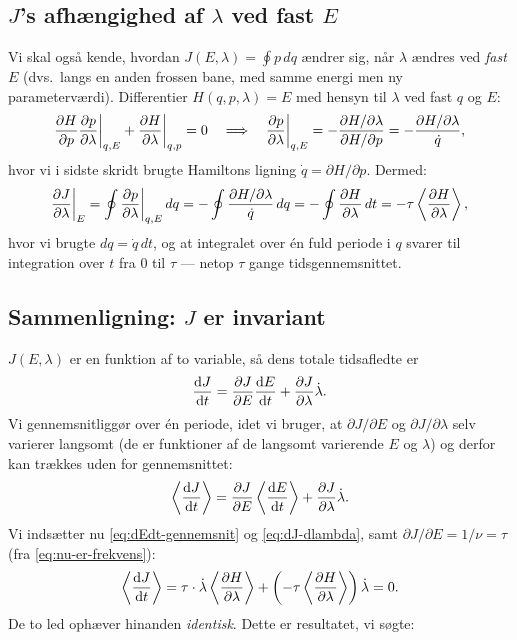 \subsection{$J$'s afhængighed af $\lambda$ ved fast $E$}

Vi skal også kende, hvordan $J(E,\lambda)=\oint p\,dq$ ændrer sig, når
$\lambda$ ændres ved \emph{fast} $E$ (dvs.\ langs en anden frossen
bane, med samme energi men ny parameterværdi). Differentier
$H(q,p,\lambda)=E$ med hensyn til $\lambda$ ved fast $q$ og $E$:
\begin{equation}
  \pdv{H}{p}\pdv{p}{\lambda}\bigg|_{q,E} + \pdv{H}{\lambda}\bigg|_{q,p} = 0
  \quad\Longrightarrow\quad
  \pdv{p}{\lambda}\bigg|_{q,E} = -\dfrac{\partial H/\partial\lambda}{\partial H/\partial p} = -\dfrac{\partial H/\partial\lambda}{\dot q},
  \label{eq:dp-dlambda}
\end{equation}
hvor vi i sidste skridt brugte Hamiltons ligning $\dot q=\partial H/\partial p$.
Dermed:
\begin{equation}
  \pdv{J}{\lambda}\bigg|_E = \oint\pdv{p}{\lambda}\bigg|_{q,E}\,dq
  = -\oint\dfrac{\partial H/\partial\lambda}{\dot q}\,dq
  = -\oint\pdv{H}{\lambda}\,dt
  = -\tau\left\langle\pdv{H}{\lambda}\right\rangle,
  \label{eq:dJ-dlambda}
\end{equation}
hvor vi brugte $dq=\dot q\,dt$, og at integralet over én fuld periode
i $q$ svarer til integration over $t$ fra $0$ til $\tau$ — netop
$\tau$ gange tidsgennemsnittet.

\subsection{Sammenligning: $J$ er invariant}

$J(E,\lambda)$ er en funktion af to variable, så dens totale
tidsafledte er
\begin{equation}
  \dv{J}{t} = \pdv{J}{E}\dv{E}{t} + \pdv{J}{\lambda}\dot\lambda.
\end{equation}
Vi gennemsnitliggør over én periode, idet vi bruger, at $\partial J/\partial E$
og $\partial J/\partial\lambda$ selv varierer langsomt (de er
funktioner af de langsomt varierende $E$ og $\lambda$) og derfor kan
trækkes uden for gennemsnittet:
\begin{equation}
  \left\langle\dv{J}{t}\right\rangle
  = \pdv{J}{E}\left\langle\dv{E}{t}\right\rangle + \pdv{J}{\lambda}\dot\lambda.
\end{equation}
Vi indsætter nu \eqref{eq:dEdt-gennemsnit} og \eqref{eq:dJ-dlambda},
samt $\partial J/\partial E=1/\nu=\tau$ (fra
\eqref{eq:nu-er-frekvens}):
\begin{equation}
  \left\langle\dv{J}{t}\right\rangle
  = \tau\cdot\dot\lambda\left\langle\pdv{H}{\lambda}\right\rangle
    + \left(-\tau\left\langle\pdv{H}{\lambda}\right\rangle\right)\dot\lambda
  = 0.
  \label{eq:J-invariant-bevis}
\end{equation}
De to led ophæver hinanden \emph{identisk}. Dette er resultatet, vi
søgte:

